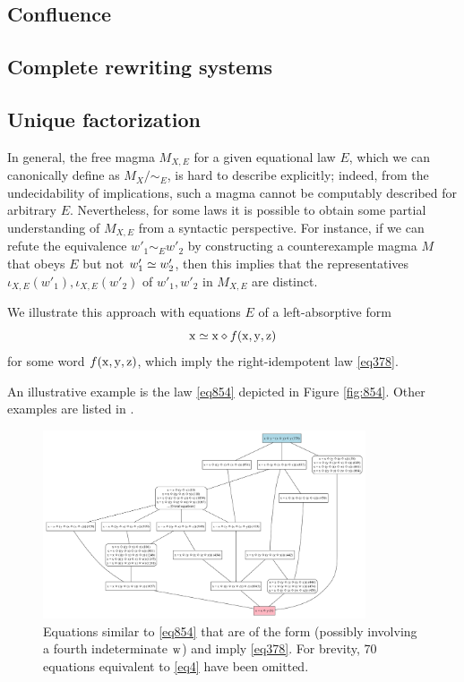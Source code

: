 \subsection{Confluence}


\subsection{Complete rewriting systems}


\subsection{Unique factorization}

In general, the free magma $M_{X,E}$ for a given equational law $E$, which we can canonically define as $M_X / \sim_E$, is hard to describe explicitly; indeed, from the undecidability of implications, such a magma cannot be computably described for arbitrary $E$.  Nevertheless, for some laws it is possible to obtain some partial understanding of $M_{X,E}$ from a syntactic perspective.  For instance, if we can refute the equivalence $w'_1 \sim_E w'_2$ by constructing a counterexample magma $M$ that obeys $E$ but not $w'_1 \simeq w'_2$, then this implies that the representatives $\iota_{X,E}(w'_1), \iota_{X,E}(w'_2)$ of  $w'_1, w'_2$ in $M_{X,E}$ are distinct.

We illustrate this approach with equations $E$ of a left-absorptive form
\begin{equation}\label{left-absorptive}
\mathrm{x} \simeq \mathrm{x} \diamond f(\mathrm{x},\mathrm{y},\mathrm{z})
\end{equation}
for some word $f(\mathrm{x},\mathrm{y},\mathrm{z})$, which imply the right-idempotent law \eqref{eq378}.

An illustrative example is the law \eqref{eq854} depicted in Figure \ref{fig:854}. Other examples are listed in .

\begin{figure}
  \centering
  \includegraphics[width=0.85\textwidth]{854-like.png}
  \caption{Equations similar to \eqref{eq854} that are of the form  (possibly involving a fourth indeterminate $\mathrm{w}$) and imply \eqref{eq378}.  For brevity, 70 equations equivalent to \eqref{eq4} have been omitted.}
  \label{fig:854-like}
  \end{figure}


